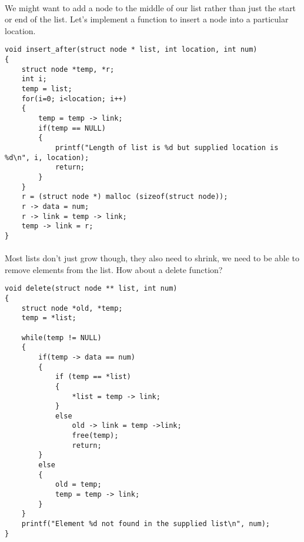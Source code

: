 \documentclass[10pt, a4paper, twosize]{article}
\begin{document}
\paragraph{} We might want to add a node to the middle of our list rather than just the start or end of the list. Let's implement a function to insert a node into a particular location.
\begin{lstlisting}
void insert_after(struct node * list, int location, int num)
{
    struct node *temp, *r;
    int i;
    temp = list;
    for(i=0; i<location; i++)
    {
        temp = temp -> link;
        if(temp == NULL)
        {
            printf("Length of list is %d but supplied location is %d\n", i, location);
            return;
        }
    }
    r = (struct node *) malloc (sizeof(struct node));
    r -> data = num;
    r -> link = temp -> link;
    temp -> link = r;
}
\end{lstlisting}
\paragraph{} 

\paragraph{} Most lists don't just grow though, they also need to shrink, we need to be able to remove elements from the list. How about a delete function?
\begin{lstlisting}
void delete(struct node ** list, int num)
{
    struct node *old, *temp;
    temp = *list;

    while(temp != NULL)
    {
        if(temp -> data == num)
        {
            if (temp == *list)
            {
                *list = temp -> link;
            }
            else
                old -> link = temp ->link;
                free(temp);
                return;
        }
        else
        {
            old = temp;
            temp = temp -> link;
        }
    }
    printf("Element %d not found in the supplied list\n", num);
}
\end{lstlisting}
\paragraph{} 
\end{document}

